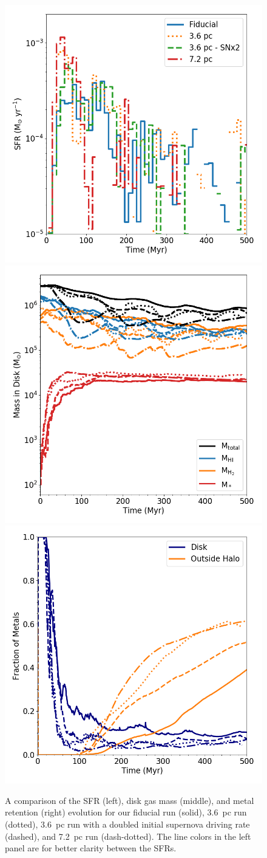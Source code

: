 \documentclass[twocolumn]{aastex61}
\begin{document}
\begin{figure}
\centering
\includegraphics[width=0.33\linewidth]{sfr_resolution_study.png}
\includegraphics[width=0.33\linewidth]{mass_evolution_resolution.png}
\includegraphics[width=0.33\linewidth]{metal_retention_resolution.png}
\caption{A comparison of the SFR (left), disk gas mass (middle), and metal retention (right) evolution for our fiducial run (solid), 3.6~pc run (dotted), 3.6~pc run with a doubled initial supernova driving rate (dashed), and 7.2~pc run (dash-dotted). The line colors in the left panel are for better clarity between the SFRs.}
\label{fig:resolution_study}
\end{figure}
\end{document}
